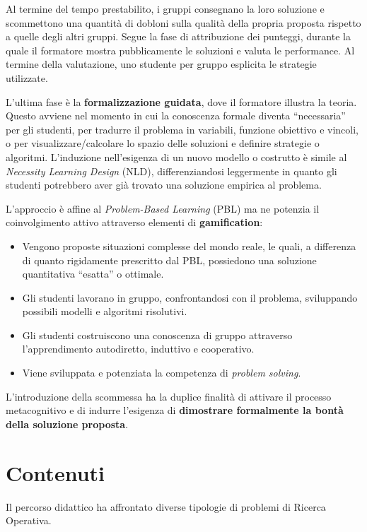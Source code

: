 \documentclass[withtimes]{easychair}
\begin{document}
Al termine del tempo prestabilito, i gruppi consegnano la loro soluzione
e scommettono una quantità di dobloni sulla qualità della propria
proposta rispetto a quelle degli altri gruppi. Segue la fase di
attribuzione dei punteggi, durante la quale il formatore mostra
pubblicamente le soluzioni e valuta le performance. Al termine della
valutazione, uno studente per gruppo esplicita le strategie utilizzate.

L'ultima fase è la \textbf{formalizzazione guidata}, dove il formatore
illustra la teoria. Questo avviene nel momento in cui la conoscenza
formale diventa ``necessaria'' per gli studenti, per tradurre il
problema in variabili, funzione obiettivo e vincoli, o per
visualizzare/calcolare lo spazio delle soluzioni e definire strategie o
algoritmi. L'induzione nell'esigenza di un nuovo modello o costrutto è
simile al \emph{Necessity Learning Design} (NLD), differenziandosi
leggermente in quanto gli studenti potrebbero aver già trovato una
soluzione empirica al problema.

L'approccio è affine al \emph{Problem-Based Learning} (PBL) ma ne
potenzia il coinvolgimento attivo attraverso elementi di
\textbf{gamification}:

\begin{itemize}
\tightlist
\item
  Vengono proposte situazioni complesse del mondo reale, le quali, a
  differenza di quanto rigidamente prescritto dal PBL, possiedono una
  soluzione quantitativa ``esatta'' o ottimale.
\item
  Gli studenti lavorano in gruppo, confrontandosi con il problema,
  sviluppando possibili modelli e algoritmi risolutivi.
\item
  Gli studenti costruiscono una conoscenza di gruppo attraverso
  l'apprendimento autodiretto, induttivo e cooperativo.
\item
  Viene sviluppata e potenziata la competenza di \emph{problem solving}.
\end{itemize}

L'introduzione della scommessa ha la duplice finalità di attivare il
processo metacognitivo e di indurre l'esigenza di \textbf{dimostrare
formalmente la bontà della soluzione proposta}.

\section{Contenuti}\label{contenuti}

Il percorso didattico ha affrontato diverse tipologie di problemi di
Ricerca Operativa.
\end{document}
